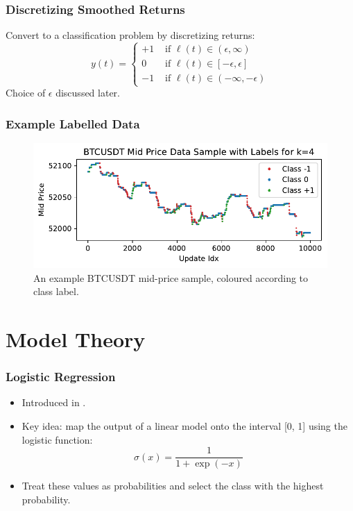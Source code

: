 \documentclass[handout]{beamer}
\begin{document}
\begin{frame}
    \frametitle{Discretizing Smoothed Returns}
    Convert to a classification problem by discretizing returns:
    \begin{equation}
        y(t) = \begin{cases} \label{desc}
            +1  & \text{ if } \ell(t) \in (\epsilon, \infty) \\
            0  & \text{ if } \ell(t) \in [-\epsilon, \epsilon] \\
           -1  & \text{ if } \ell(t) \in  (-\infty, -\epsilon)
       \end{cases}
    \end{equation}
    Choice of $\epsilon$ discussed later.
\end{frame}


\begin{frame}
    \frametitle{Example Labelled Data}
        \begin{figure}[ht]
            \centering
            \includegraphics[width=1.0\textwidth]{./images/example_labels.pdf}
            \caption{An example BTCUSDT mid-price sample, coloured according to class label.}
            \label{fig:example_mid_price_labelling}
        \end{figure}
\end{frame}

\section{Model Theory}

\begin{frame}
    \frametitle{Logistic Regression}
     \begin{itemize}
        \item Introduced in {\color{blue}\cite{COX1958}}.
        \item Key idea: map the output of a linear model onto the interval [0, 1] using the logistic function:
            \begin{equation}
               \sigma(x) = \frac{1}{1 + \exp(-x)} 
            \end{equation}
        \item Treat these values as probabilities and select the class with the highest probability.
    \end{itemize}
    
\end{frame}
\end{document}
